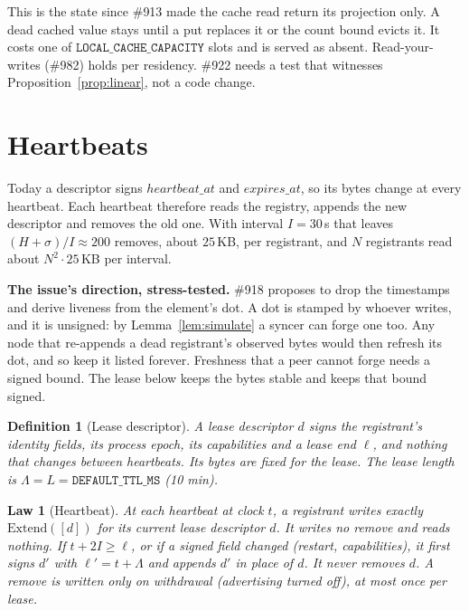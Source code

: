 \documentclass[journal]{IEEEtran}
\newtheorem{definition}{Definition}
\newtheorem{law}{Law}
\newcommand{\issue}[1]{\#{#1}}
\begin{document}
This is the state since \issue{913} made the cache read return its projection only.  A dead
cached value stays until a put replaces it or the count bound evicts it.  It costs one of
$\mathtt{LOCAL\_CACHE\_CAPACITY}$ slots and is served as absent.  Read-your-writes
(\issue{982}) holds per residency.  \issue{922} needs a test that witnesses
Proposition~\ref{prop:linear}, not a code change.

\section{Heartbeats}\label{sec:heartbeat}

Today a descriptor signs $\mathit{heartbeat\_at}$ and $\mathit{expires\_at}$, so its bytes
change at every heartbeat.  Each heartbeat therefore reads the registry, appends the new
descriptor and removes the old one.  With interval $I=30$\,s that leaves
$(H+\sigma)/I\approx200$ removes, about $25$\,KB, per registrant, and $N$ registrants read
about $N^2\cdot25$\,KB per interval.

\textbf{The issue's direction, stress-tested.}  \issue{918} proposes to drop the timestamps
and derive liveness from the element's dot.  A dot is stamped by whoever writes, and it is
unsigned: by Lemma~\ref{lem:simulate} a syncer can forge one too.  Any node that re-appends a
dead registrant's observed bytes would then refresh its dot, and so keep it listed forever.
Freshness that a peer cannot forge needs a signed bound.  The lease below keeps the bytes
stable and keeps that bound signed.

\begin{definition}[Lease descriptor]\label{def:lease}
A lease descriptor $d$ signs the registrant's identity fields, its process epoch, its
capabilities and a lease end $\ell$, and nothing that changes between heartbeats.  Its bytes
are fixed for the lease.  The lease length is $\Lambda=L=\mathtt{DEFAULT\_TTL\_MS}$ (10 min).
\end{definition}

\begin{law}[Heartbeat]\label{law:heartbeat}
At each heartbeat at clock $t$, a registrant writes exactly $\mathrm{Extend}([d])$ for its
current lease descriptor $d$.  It writes no remove and reads nothing.  If $t+2I\ge\ell$, or
if a signed field changed (restart, capabilities), it first signs $d'$ with $\ell'=t+\Lambda$
and appends $d'$ in place of $d$.  It never removes $d$.  A remove is written only on
withdrawal (advertising turned off), at most once per lease.
\end{law}
\end{document}
